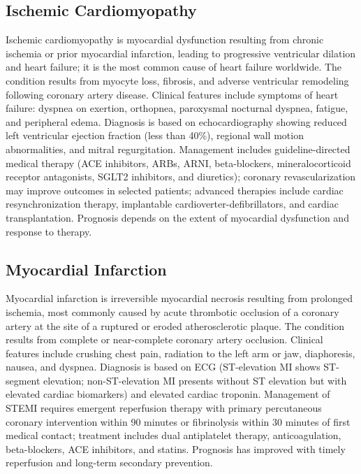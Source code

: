 \subsection{Ischemic Cardiomyopathy}
\label{sec:Ischemic Cardiomyopathy}
Ischemic cardiomyopathy is myocardial dysfunction resulting from chronic ischemia or prior myocardial infarction, leading to progressive ventricular dilation and heart failure; it is the most common cause of heart failure worldwide. The condition results from myocyte loss, fibrosis, and adverse ventricular remodeling following coronary artery disease. Clinical features include symptoms of heart failure: dyspnea on exertion, orthopnea, paroxysmal nocturnal dyspnea, fatigue, and peripheral edema. Diagnosis is based on echocardiography showing reduced left ventricular ejection fraction (less than 40\%), regional wall motion abnormalities, and mitral regurgitation. Management includes guideline-directed medical therapy (ACE inhibitors, ARBs, ARNI, beta-blockers, mineralocorticoid receptor antagonists, SGLT2 inhibitors, and diuretics); coronary revascularization may improve outcomes in selected patients; advanced therapies include cardiac resynchronization therapy, implantable cardioverter-defibrillators, and cardiac transplantation. Prognosis depends on the extent of myocardial dysfunction and response to therapy.

\subsection{Myocardial Infarction}
\label{sec:Myocardial Infarction}
Myocardial infarction is irreversible myocardial necrosis resulting from prolonged ischemia, most commonly caused by acute thrombotic occlusion of a coronary artery at the site of a ruptured or eroded atherosclerotic plaque. The condition results from complete or near-complete coronary artery occlusion. Clinical features include crushing chest pain, radiation to the left arm or jaw, diaphoresis, nausea, and dyspnea. Diagnosis is based on ECG (ST-elevation MI shows ST-segment elevation; non-ST-elevation MI presents without ST elevation but with elevated cardiac biomarkers) and elevated cardiac troponin. Management of STEMI requires emergent reperfusion therapy with primary percutaneous coronary intervention within 90 minutes or fibrinolysis within 30 minutes of first medical contact; treatment includes dual antiplatelet therapy, anticoagulation, beta-blockers, ACE inhibitors, and statins. Prognosis has improved with timely reperfusion and long-term secondary prevention.

